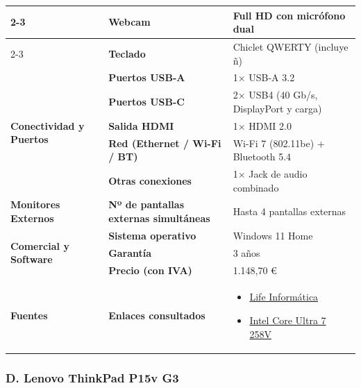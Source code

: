 \documentclass[11.5pt]{article}
\begin{document}
\begin{table}[H]
\begin{tabularx}{\textwidth}{|l|l|X|}
			\cline{2-3}
			& \textbf{Webcam} & Full HD con micrófono dual \\
			\cline{2-3}
			& \textbf{Teclado} & Chiclet QWERTY (incluye ñ) \\
			\hline
			\multirow{5}{*}{\textbf{Conectividad y Puertos}} 
			& \textbf{Puertos USB-A} & 1\(\times\) USB-A 3.2 \\
			\cline{2-3}
			& \textbf{Puertos USB-C} & 2\(\times\) USB4 (40 Gb/s, DisplayPort y carga) \\
			\cline{2-3}
			& \textbf{Salida HDMI} & 1\(\times\) HDMI 2.0 \\
			\cline{2-3}
			& \textbf{Red (Ethernet / Wi-Fi / BT)} & Wi-Fi 7 (802.11be) + Bluetooth 5.4 \\
			\cline{2-3}
			& \textbf{Otras conexiones} & 1\(\times\) Jack de audio combinado \\
			\hline
			\textbf{Monitores Externos} & \textbf{Nº de pantallas externas simultáneas} & Hasta 4 pantallas externas \\
			\hline
			\multirow{3}{*}{\textbf{Comercial y Software}} 
			& \textbf{Sistema operativo} & Windows 11 Home \\
			\cline{2-3}
			& \textbf{Garantía} & 3 años \\
			\cline{2-3}
			& \textbf{Precio (con IVA)} & 1.148,70 € \\
			\hline
			\textbf{Fuentes} & \textbf{Enlaces consultados} & 
			\begin{itemize}[leftmargin=*,nosep]
				\item \href{https://lifeinformatica.com/tienda/medion-sprchrgd-14-s2-md62722-portatil-intel-core-ultra-7-258v-32gb-ddr5-1tb-ssd-nvme-14-2-8k-windows-11-home/}{Life Informática}
				\item \href{https://www.intel.la/content/www/xl/es/products/sku/240957/intel-core-ultra-7-processor-258v-12m-cache-up-to-4-80-ghz/specifications.html}{Intel Core Ultra 7 258V}
			\end{itemize} \\
			\hline
		\end{tabularx}
	\end{table}
	
	\subsubsection*{D. Lenovo ThinkPad P15v G3}
	
\end{document}

